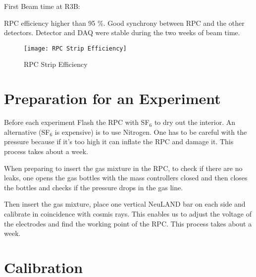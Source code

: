First Beam time at R3B:

RPC eﬃciency higher than 95 \%.
Good synchrony between RPC and the other detectors.
Detector and DAQ were stable during the two weeks of beam time.

\begin{figure}
	\texttt{[image: RPC Strip Efficiency]}
	\caption{RPC Strip Efficiency}
	\label{fig:RPCStripEff}
\end{figure}


\section{Preparation for an Experiment}


Before each experiment
Flash the RPC with SF$_6$ to dry out the interior. An alternative (SF$_6$ is expensive) is to use Nitrogen. One has to be careful with the pressure because if it's too high it can inflate the RPC and damage it.
This process takes about a week.

When preparing to insert the gas mixture in the RPC, to check if there are no leaks, one opens the gas bottles with the mass controllers closed and then closes the bottles and checks if the pressure drops in the gas line.

Then insert the gas mixture, place one vertical NeuLAND bar on each side and calibrate in coincidence with cosmis rays. This enables us to adjust the voltage of the electrodes and find the working point of the RPC.
This process takes about a week.


\section{Calibration}